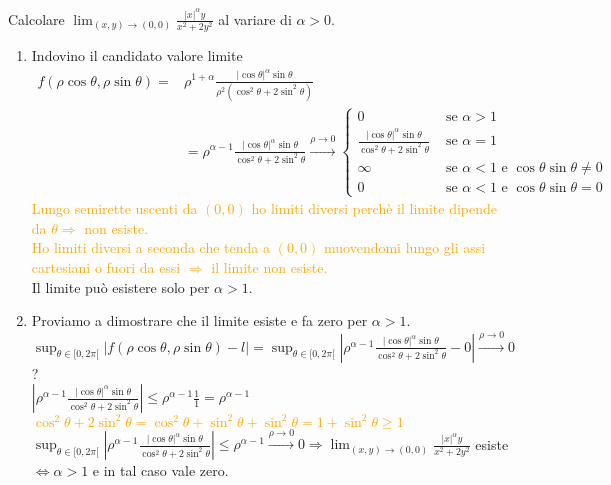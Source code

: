 \begin{exbar}
\begin{example}
	Calcolare $\lim_{(x,y)\rightarrow(0,0)}\frac{|x|^\alpha y}{x^2+2y^2}$ al variare di $\alpha >0$.
	\begin{enumerate}
		\item Indovino il candidato valore limite
		\begin{align*}
			f(\rho\cos\theta,\rho\sin\theta)=&\rho^{1+\alpha}\frac{|\cos\theta|^\alpha\sin\theta}{\rho^2(\cos^2\theta+2\sin^2\theta)}\\
			&=\rho^{\alpha-1}\frac{|\cos\theta|^\alpha \sin\theta}{\cos^2\theta+2\sin^2\theta}\xrightarrow{\rho\rightarrow0}\begin{cases}
				0 &\text{  se  } \alpha > 1\\
				\frac{|\cos\theta|^\alpha \sin \theta}{\cos^2\theta+2\sin^2\theta}&\text{  se  } \alpha=1\\
				\infty &\text{  se  } \alpha < 1 \text{  e   } \cos\theta \sin\theta \neq 0\\
				0 &\text{  se  } \alpha < 1  \text{  e   } \cos\theta \sin\theta = 0
			\end{cases}
		\end{align*}
		\textcolor{orange}{Lungo semirette uscenti da $(0,0)$ ho limiti diversi perchè il limite dipende da $\theta \Rightarrow$ non esiste.\\Ho limiti diversi a seconda che tenda a $(0,0)$ muovendomi lungo gli assi cartesiani o fuori da essi $\Rightarrow$ il limite non esiste.}\\
		Il limite può esistere solo per $\alpha > 1$.
		\item Proviamo a dimostrare che il limite esiste e fa zero per $\alpha >1$.\\
		$\sup_{\theta \in [0,2\pi[}|f(\rho\cos\theta,\rho\sin\theta)-l|=\sup_{\theta \in [0,2\pi[}|\rho^{\alpha-1}\frac{|\cos \theta|^\alpha \sin\theta}{\cos^2\theta+2\sin^2\theta}-0|\xrightarrow{\rho\rightarrow0}0$?\\
		$ |\rho^{\alpha-1}\frac{|\cos \theta|^\alpha \sin\theta}{\cos^2\theta+2\sin^2\theta}| \leq \rho^{\alpha-1}\frac{1}{1}=\rho^{\alpha-1}$\\
		\textcolor{orange}{$\cos^2\theta+2\sin^2\theta=\cos^2\theta+\sin^2\theta+\sin^2\theta=1+\sin^2\theta \geq 1$}\\
		$\sup_{\theta \in [0,2\pi[}|\rho^{\alpha-1}\frac{|\cos\theta|^\alpha\sin\theta}{\cos^2\theta+2\sin^2\theta}|\leq \rho^{\alpha-1}\xrightarrow{\rho\rightarrow0}0 \Rightarrow \lim_{(x,y)\rightarrow(0,0)}\frac{|x|^\alpha y}{x^2+2y^2}$ esiste $\Leftrightarrow \alpha> 1$ e in tal caso vale zero. 
	\end{enumerate}
\end{example}
\end{exbar}

